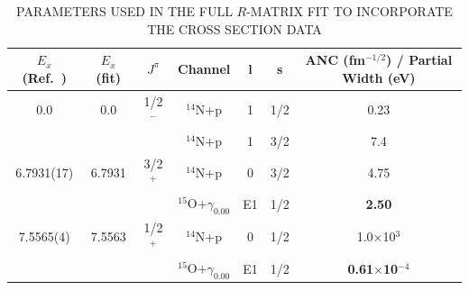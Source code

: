 \begin{table}[]
\caption{PARAMETERS USED IN THE FULL $R$-MATRIX FIT TO INCORPORATE THE CROSS SECTION DATA}
\begin{center}
\begin{threeparttable}
\centering
\begin{tabular}{c  c  c  c  c  c  c}
$E_x$ (Ref.~\cite{Ajzenberg-Selove1991, Daigle2016}) &   $E_x$ (fit) & $J^\pi$ & Channel & l & s & ANC (fm$^{-1/2}$) / Partial Width (eV) \\ 
   \hline
0.0 & 0.0	& 1/2$^-$ &	$^{14}$N+p &	1&	1/2&	{0.23}\\
	&	&	    &    $^{14}$N+p &	1&	3/2&	{7.4} \\
6.7931(17) & {6.7931}&	3/2$^+$ & $^{14}$N+p &	0&	3/2&	{4.75}\\
	&	&	     &  $^{15}$O+$\gamma_{0.00}$	&  E1  &	1/2&	\textbf{2.50}\\
\hline
7.5565(4) & 7.5563	&	1/2$^+$	&	$^{14}$N+p	&	0	&	1/2	&	{1.0$\times$10$^3$}	\\
	&	&	&	$^{15}$O+$\gamma_{0.00}$	&	E1	&	1/2	&	\textbf{0.61$\times$10$^{-4}$}\\

\end{tabular}
\end{threeparttable}
\end{center}
\end{table}
